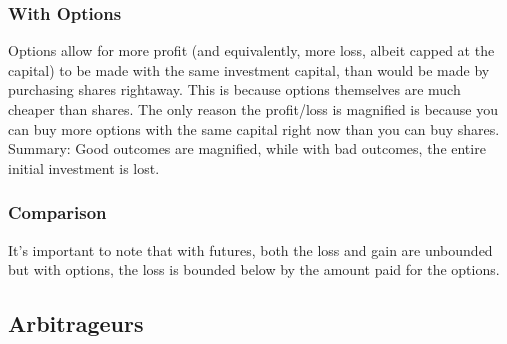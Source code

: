 \documentclass{article}
\begin{document}
\subsubsection{With Options}
Options allow for more profit (and equivalently, more loss, albeit capped at
the capital) to be made with the same investment capital,
than would be made by purchasing shares rightaway. This is because options themselves are much cheaper
than shares. The only reason the profit/loss is magnified is because you can buy more options with the
same capital right now than you can buy shares. Summary: Good outcomes are magnified, while with
bad outcomes, the entire initial investment is lost.
\subsubsection{Comparison}
It's important to note that with futures, both the loss and gain are unbounded but with options, the 
loss is bounded below by the amount paid for the options.
\subsection{Arbitrageurs}
\end{document}
